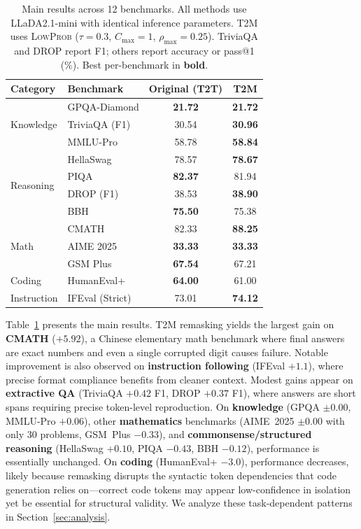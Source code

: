 \documentclass{article}
\newcommand{\TtoM}{\textrm{T2M}}
\begin{document}
\begin{table}[t]
\centering
\caption{Main results across 12 benchmarks. All methods use LLaDA2.1-mini with identical inference parameters. T2M uses \textsc{LowProb} ($\tau{=}0.3$, $C_{\max}{=}1$, $\rho_{\max}{=}0.25$). TriviaQA and DROP report F1; others report accuracy or pass@1 (\%). Best per-benchmark in \textbf{bold}.}
\label{tab:main}
\vspace{4pt}
\small
\begin{tabular}{llcc}
\toprule
\textbf{Category} & \textbf{Benchmark} & \textbf{Original (T2T)} & \textbf{T2M} \\
\midrule
\multirow{3}{*}{Knowledge}
  & GPQA-Diamond   & \textbf{21.72} & \textbf{21.72} \\
  & TriviaQA (F1)  & 30.54          & \textbf{30.96} \\
  & MMLU-Pro       & 58.78          & \textbf{58.84} \\
\midrule
\multirow{4}{*}{Reasoning}
  & HellaSwag      & 78.57          & \textbf{78.67} \\
  & PIQA           & \textbf{82.37} & 81.94          \\
  & DROP (F1)      & 38.53          & \textbf{38.90} \\
  & BBH            & \textbf{75.50} & 75.38          \\
\midrule
\multirow{3}{*}{Math}
  & CMATH          & 82.33          & \textbf{88.25} \\
  & AIME 2025      & \textbf{33.33} & \textbf{33.33} \\
  & GSM Plus       & \textbf{67.54} & 67.21          \\
\midrule
Coding
  & HumanEval+     & \textbf{64.00} & 61.00          \\
\midrule
Instruction
  & IFEval (Strict) & 73.01         & \textbf{74.12} \\
\bottomrule
\end{tabular}
\end{table}

Table~\ref{tab:main} presents the main results. \TtoM{} remasking yields the largest gain on \textbf{CMATH} ($+5.92$), a Chinese elementary math benchmark where final answers are exact numbers and even a single corrupted digit causes failure. Notable improvement is also observed on \textbf{instruction following} (IFEval $+1.1$), where precise format compliance benefits from cleaner context. Modest gains appear on \textbf{extractive QA} (TriviaQA $+0.42$ F1, DROP $+0.37$ F1), where answers are short spans requiring precise token-level reproduction. On \textbf{knowledge} (GPQA $\pm 0.00$, MMLU-Pro $+0.06$), other \textbf{mathematics} benchmarks (AIME~2025 $\pm 0.00$ with only 30 problems, GSM~Plus $-0.33$), and \textbf{commonsense/structured reasoning} (HellaSwag $+0.10$, PIQA $-0.43$, BBH $-0.12$), performance is essentially unchanged. On \textbf{coding} (HumanEval+ $-3.0$), performance decreases, likely because remasking disrupts the syntactic token dependencies that code generation relies on---correct code tokens may appear low-confidence in isolation yet be essential for structural validity. We analyze these task-dependent patterns in Section~\ref{sec:analysis}.
\end{document}
